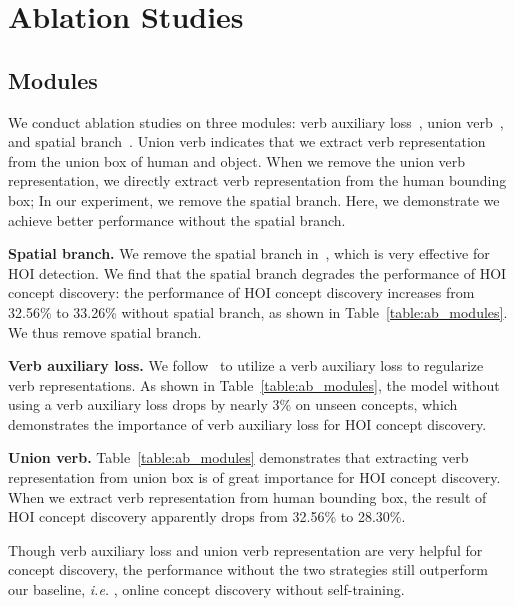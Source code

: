\documentclass[runningheads]{llncs}
\newcommand{\ie}{\textit{i.e. }}
\begin{document}
\section{Ablation Studies}
\label{sec:ab}


\subsection{Modules}

We conduct ablation studies on three modules: verb auxiliary loss~\cite{hou2021fcl}, union verb~\cite{hou2020visual}, and spatial branch~\cite{gao2018ican}. Union verb indicates that we extract verb representation from the union box of human and object. When we remove the union verb representation, we directly extract verb representation from the human bounding box; In our experiment, we remove the spatial branch. Here, we demonstrate we achieve better performance without the spatial branch.

{\bf Spatial branch.} We remove the spatial branch in~\cite{gao2018ican}, which is very effective for HOI detection. We find that the spatial branch degrades the performance of HOI concept discovery: the performance of HOI concept discovery increases from 32.56\% to 33.26\% without spatial branch, as shown in Table~\ref{table:ab_modules}. We thus remove spatial branch.

{\bf Verb auxiliary loss.} We follow~\cite{hou2021fcl} to utilize a verb auxiliary loss to regularize verb representations. As shown in Table~\ref{table:ab_modules}, the model without using a verb auxiliary loss drops by nearly 3\% on unseen concepts, which demonstrates the importance of verb auxiliary loss for HOI concept discovery.

{\bf Union verb.} Table~\ref{table:ab_modules} demonstrates that extracting verb representation from union box is of great importance for HOI concept discovery. When we extract verb representation from human bounding box, the result of HOI concept discovery apparently drops from 32.56\% to 28.30\%. 

Though verb auxiliary loss and union verb representation are very helpful for concept discovery, the performance without the two strategies still outperform our baseline, \ie, online concept discovery without self-training.
\end{document}

